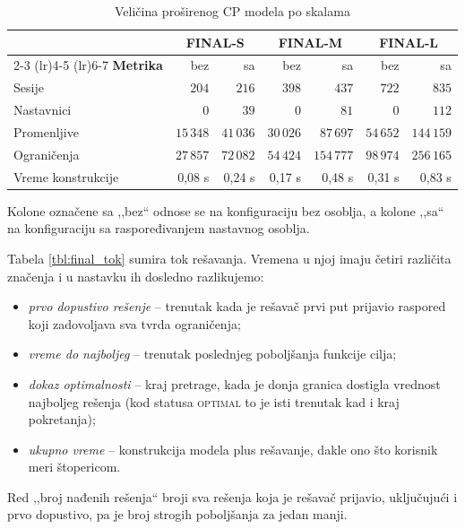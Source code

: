 \documentclass[12pt,oneside]{memoir}
\begin{document}
\begin{table}[ht]
\centering
\caption{Veličina proširenog CP modela po skalama}
\label{tbl:final_size}
\begin{tabular}{lrrrrrr}
\toprule
& \multicolumn{2}{c}{\textbf{FINAL-S}}
& \multicolumn{2}{c}{\textbf{FINAL-M}}
& \multicolumn{2}{c}{\textbf{FINAL-L}} \\
\cmidrule(lr){2-3} \cmidrule(lr){4-5} \cmidrule(lr){6-7}
\textbf{Metrika} & bez & sa & bez & sa & bez & sa \\
\midrule
Sesije             & $204$      & $216$      & $398$      & $437$       & $722$      & $835$ \\
Nastavnici         & $0$        & $39$       & $0$        & $81$        & $0$        & $112$ \\
Promenljive        & $15\,348$  & $41\,036$  & $30\,026$  & $87\,697$   & $54\,652$  & $144\,159$ \\
Ograničenja        & $27\,857$  & $72\,082$  & $54\,424$  & $154\,777$  & $98\,974$  & $256\,165$ \\
Vreme konstrukcije & 0,08 s     & 0,24 s     & 0,17 s     & 0,48 s      & 0,31 s     & 0,83 s \\
\bottomrule
\end{tabular}
\end{table}

Kolone označene sa ,,bez`` odnose se na konfiguraciju bez osoblja, a
kolone ,,sa`` na konfiguraciju sa raspoređivanjem nastavnog osoblja.

Tabela \ref{tbl:final_tok} sumira tok rešavanja. Vremena u njoj imaju
četiri različita značenja i u nastavku ih dosledno razlikujemo:

\begin{itemize}
\item \emph{prvo dopustivo rešenje} -- trenutak kada je rešavač prvi put
  prijavio raspored koji zadovoljava sva tvrda ograničenja;
\item \emph{vreme do najboljeg} -- trenutak poslednjeg poboljšanja
  funkcije cilja;
\item \emph{dokaz optimalnosti} -- kraj pretrage, kada je donja granica
  dostigla vrednost najboljeg rešenja (kod statusa \textsc{optimal} to je
  isti trenutak kad i kraj pokretanja);
\item \emph{ukupno vreme} -- konstrukcija modela plus rešavanje, dakle
  ono što korisnik meri štopericom.
\end{itemize}

Red ,,broj nađenih rešenja`` broji sva rešenja koja je rešavač prijavio,
uključujući i prvo dopustivo, pa je broj strogih poboljšanja za jedan
manji.
\end{document}
